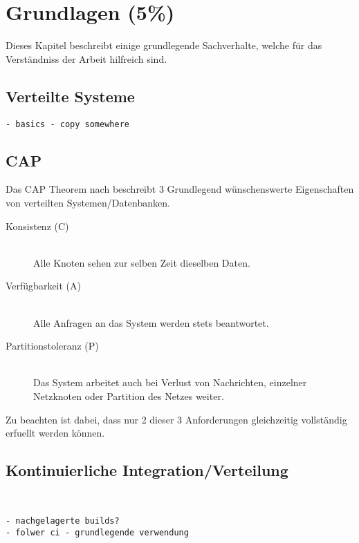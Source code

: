 \chapter{Grundlagen (5\%)}
\label{chap:base}
Dieses Kapitel beschreibt einige grundlegende Sachverhalte,
welche f\"ur das Verst\"andniss der Arbeit hilfreich sind.

\section{Verteilte Systeme}
\label{sec:base:vs}

\begin{verbatim}
- basics - copy somewhere
\end{verbatim}

\section{CAP}
\label{sec:base:cap}


Das CAP Theorem nach \cite{brewer:cap} beschreibt 3 Grundlegend
w\"unschenswerte Eigenschaften von verteilten Systemen/Datenbanken.

\begin{description}
  \item[Konsistenz (C)] \hfill \\
      Alle Knoten sehen zur selben Zeit dieselben Daten. 
  \item[Verf\"ugbarkeit (A)] \hfill \\
      Alle Anfragen an das System werden stets beantwortet.
  \item[Partitionstoleranz (P)] \hfill \\
      Das System arbeitet auch bei Verlust von Nachrichten,
      einzelner Netzknoten oder Partition des Netzes weiter.
\end{description}

Zu beachten ist dabei, dass nur 2 dieser 3 Anforderungen gleichzeitig
vollst\"andig erfuellt werden k\"onnen.






\section{Kontinuierliche Integration/Verteilung}
\label{sec:base:ci}
\begin{verbatim}


- nachgelagerte builds?
- folwer ci - grundlegende verwendung 
\end{verbatim}
\cite{folwer:receipe}

